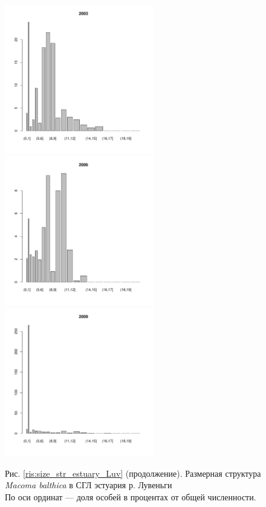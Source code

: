 \documentclass[12pt, a4paper]{article}
\begin{document}
\begin{figure}[h]
\begin{multicols}{3}
\hfill
\includegraphics[width=65mm]{../White_Sea/Estuatiy_Luvenga/sizestr_percents_2003_.pdf}
\hfill
\includegraphics[width=65mm]{../White_Sea/Estuatiy_Luvenga/sizestr_percents_2006_.pdf}
\hfill
\includegraphics[width=65mm]{../White_Sea/Estuatiy_Luvenga/sizestr_percents_2009_.pdf}
\end{multicols}



\begin{center}
Рис. \ref{ris:size_str_estuary_Luv} (продолжение). Размерная структура {\it Macoma balthica} в СГЛ эстуария р. Лувеньги\\
По оси ординат --- доля особей в процентах от общей численности.

\end{center}
\end{figure}
\end{document}
